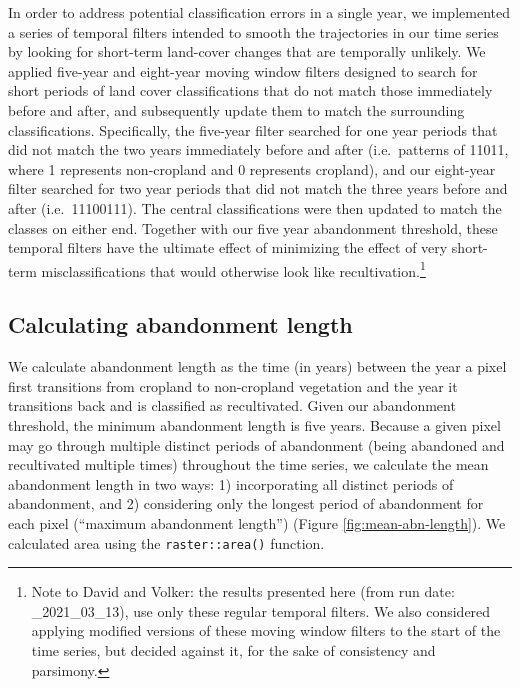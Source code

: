\documentclass[
]{article}
\begin{document}
In order to address potential classification errors in a single year, we implemented a series of temporal filters intended to smooth the trajectories in our time series by looking for short-term land-cover changes that are temporally unlikely.
We applied five-year and eight-year moving window filters designed to search for short periods of land cover classifications that do not match those immediately before and after, and subsequently update them to match the surrounding classifications.
Specifically, the five-year filter searched for one year periods that did not match the two years immediately before and after (i.e.~patterns of 11011, where 1 represents non-cropland and 0 represents cropland), and our eight-year filter searched for two year periods that did not match the three years before and after (i.e.~11100111).
The central classifications were then updated to match the classes on either end.
Together with our five year abandonment threshold, these temporal filters have the ultimate effect of minimizing the effect of very short-term misclassifications that would otherwise look like recultivation.\footnote{Note to David and Volker: the results presented here (from run date: \_2021\_03\_13), use only these regular temporal filters. We also considered applying modified versions of these moving window filters to the start of the time series, but decided against it, for the sake of consistency and parsimony.}

\hypertarget{calculating-abandonment-length}{%
\subsection{Calculating abandonment length}\label{calculating-abandonment-length}}

We calculate abandonment length as the time (in years) between the year a pixel first transitions from cropland to non-cropland vegetation and the year it transitions back and is classified as recultivated.
Given our abandonment threshold, the minimum abandonment length is five years.
Because a given pixel may go through multiple distinct periods of abandonment (being abandoned and recultivated multiple times) throughout the time series, we calculate the mean abandonment length in two ways: 1) incorporating all distinct periods of abandonment, and 2) considering only the longest period of abandonment for each pixel (``maximum abandonment length'') (Figure \ref{fig:mean-abn-length}).
We calculated area using the \texttt{raster::area()} function.
\end{document}
